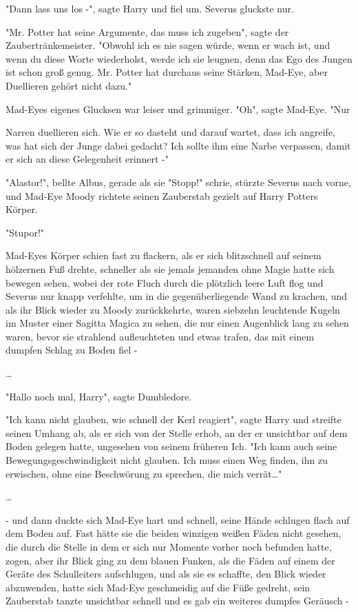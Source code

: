 {"Dann lass uns los -", sagte Harry und fiel um. Severus gluckste nur.

"Mr. Potter hat seine Argumente, das muss ich zugeben", sagte der Zaubertränkemeister. "Obwohl ich es nie sagen würde, wenn er wach ist, und wenn du diese Worte wiederholst, werde ich sie leugnen, denn das Ego des Jungen ist schon groß genug. Mr. Potter hat durchaus seine Stärken, Mad-Eye, aber Duellieren gehört nicht dazu."

Mad-Eyes eigenes Glucksen war leiser und grimmiger. "Oh", sagte Mad-Eye. "Nur

Narren duellieren sich. Wie er so dasteht und darauf wartet, dass ich angreife, was hat sich der Junge dabei gedacht? Ich sollte ihm eine Narbe verpassen, damit er sich an diese Gelegenheit erinnert -"

"Alastor!", bellte Albus, gerade als sie "Stopp!" schrie, stürzte Severus nach vorne, und Mad-Eye Moody richtete seinen Zauberstab gezielt auf Harry Potters Körper.

"Stupor!"

Mad-Eyes Körper schien fast zu flackern, als er sich blitzschnell auf seinem hölzernen Fuß drehte, schneller als sie jemals jemanden ohne Magie hatte sich bewegen sehen, wobei der rote Fluch durch die plötzlich leere Luft flog und Severus nur knapp verfehlte, um in die gegenüberliegende Wand zu krachen, und als ihr Blick wieder zu Moody zurückkehrte, waren siebzehn leuchtende Kugeln im Muster einer Sagitta Magica zu sehen, die nur einen Augenblick lang zu sehen waren, bevor sie strahlend aufleuchteten und etwas trafen, das mit einem dumpfen Schlag zu Boden fiel -

…

"Hallo noch mal, Harry", sagte Dumbledore.

"Ich kann nicht glauben, wie schnell der Kerl reagiert", sagte Harry und streifte seinen Umhang ab, als er sich von der Stelle erhob, an der er unsichtbar auf dem Boden gelegen hatte, ungesehen von seinem früheren Ich. "Ich kann auch seine Bewegungsgeschwindigkeit nicht glauben. Ich muss einen Weg finden, ihn zu erwischen, ohne eine Beschwörung zu sprechen, die mich verrät…"

…

- und dann duckte sich Mad-Eye hart und schnell, seine Hände schlugen flach auf dem Boden auf. Fast hätte sie die beiden winzigen weißen Fäden nicht gesehen, die durch die Stelle in dem er sich nur Momente vorher noch befunden hatte, zogen, aber ihr Blick ging zu dem blauen Funken, als die Fäden auf einem der Geräte des Schulleiters aufschlugen, und als sie es schaffte, den Blick wieder abzuwenden, hatte sich Mad-Eye geschmeidig auf die Füße gedreht, sein Zauberstab tanzte unsichtbar schnell und es gab ein weiteres dumpfes Geräusch -

}
